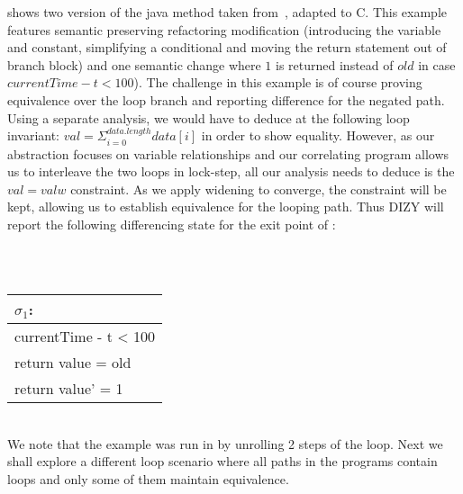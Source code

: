  shows two version of the java  method taken from~\cite{DEP:FSE08}, adapted to C. This example features semantic preserving refactoring modification (introducing the  variable and  constant, simplifying a conditional and moving the return statement out of branch block) and one semantic change where $1$ is returned instead of $old$ in case $currentTime - t < 100$). The challenge in this example is of course proving equivalence over the loop branch and reporting difference for the negated path. Using a separate analysis, we would have to deduce at the following loop invariant: $val = \Sigma_{i=0}^{data.length}data[i]$ in order to show equality. However, as our abstraction focuses on variable relationships and our correlating program allows us to interleave the two loops in lock-step, all our analysis needs to deduce is the $val = valw$ constraint. As we apply widening to converge, the constraint will be kept, allowing us to establish equivalence for the looping path. Thus DIZY will report the following differencing state for the exit point of :
\begin{tabular}{c}
\\
\end{tabular}
\\
\begin{tabular}{l}
$\sigma_1$:
\\ \hline
currentTime - t < 100
\\
return value = old 
\\
return value' = 1
\\ \hline
\end{tabular}
\\
We note that the example was run in \cite{DEP:FSE08} by unrolling 2 steps of the loop. Next we shall explore a different loop scenario where all paths in the programs contain loops and only some of them maintain equivalence.



